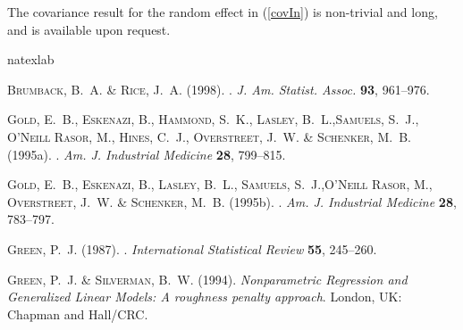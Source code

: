 \documentclass[article,lineno]{biometrika}
\begin{document}
\begin{remark}
The covariance result for the random effect in (\ref{covIn}) is non-trivial and long, and is available upon request.
\end{remark}

%
%

\begin{thebibliography}{7}
\expandafter\ifx\csname natexlab\endcsname\relax\def\natexlab#1{#1}\fi

\textsc{Brumback, B.~A.} \& \textsc{Rice, J.~A.} (1998).
.
\newblock \textit{J. Am. Statist. Assoc.} \textbf{93}, 961--976.

\textsc{Gold, E.~B.}, \textsc{Eskenazi, B.}, \textsc{Hammond, S.~K.}, \textsc{Lasley, B.~L.},\textsc{Samuels, S.~J.}, \textsc{O'Neill Rasor, M.},  \textsc{Hines, C.~J.}, \textsc{Overstreet, J.~W.} \& \textsc{Schenker, M.~B.} (1995a).
.
\newblock \textit{Am. J. Industrial Medicine} \textbf{28}, 799--815.

\textsc{Gold, E.~B.}, \textsc{Eskenazi, B.}, \textsc{Lasley, B.~L.}, \textsc{Samuels, S.~J.},\textsc{O'Neill Rasor, M.}, \textsc{Overstreet, J.~W.} \& \textsc{Schenker, M.~B.}
  (1995b).
.
\newblock \textit{Am. J. Industrial Medicine} \textbf{28}, 783--797.

\textsc{Green, P.~J.}  (1987).
.
\newblock \textit{International Statistical Review} \textbf{55}, 245--260.

\textsc{Green, P.~J.} \& \textsc{Silverman, B.~W.} (1994).
\newblock \textit{{Nonparametric Regression and Generalized Linear Models: A roughness penalty approach}}.
\newblock London, UK: Chapman and Hall/CRC.


\end{thebibliography}
\end{document}
